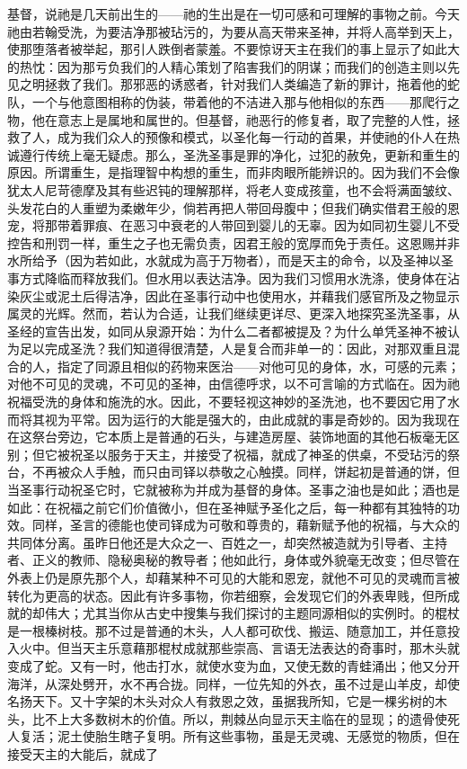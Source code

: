 基督，说祂是几天前出生的——祂的生出是在一切可感和可理解的事物之前。今天祂由若翰受洗，为要洁净那被玷污的，为要从高天带来圣神，并将人高举到天上，使那堕落者被举起，那引人跌倒者蒙羞。不要惊讶天主在我们的事上显示了如此大的热忱：因为那亏负我们的人精心策划了陷害我们的阴谋；而我们的创造主则以先见之明拯救了我们。那邪恶的诱惑者，针对我们人类编造了新的罪计，拖着他的蛇队，一个与他意图相称的伪装，带着他的不洁进入那与他相似的东西——那爬行之物，他在意志上是属地和属世的。但基督，祂恶行的修复者，取了完整的人性，拯救了人，成为我们众人的预像和模式，以圣化每一行动的首果，并使祂的仆人在热诚遵行传统上毫无疑虑。那么，圣洗圣事是罪的净化，过犯的赦免，更新和重生的原因。所谓重生，是指理智中构想的重生，而非肉眼所能辨识的。因为我们不会像犹太人尼苛德摩及其有些迟钝的理解那样，将老人变成孩童，也不会将满面皱纹、头发花白的人重塑为柔嫩年少，倘若再把人带回母腹中；但我们确实借君王般的恩宠，将那带着罪痕、在恶习中衰老的人带回到婴儿的无辜。因为如同初生婴儿不受控告和刑罚一样，重生之子也无需负责，因君王般的宽厚而免于责任。这恩赐并非水所给予（因为若如此，水就成为高于万物者），而是天主的命令，以及圣神以圣事方式降临而释放我们。但水用以表达洁净。因为我们习惯用水洗涤，使身体在沾染灰尘或泥土后得洁净，因此在圣事行动中也使用水，并藉我们感官所及之物显示属灵的光辉。然而，若认为合适，让我们继续更详尽、更深入地探究圣洗圣事，从圣经的宣告出发，如同从泉源开始：为什么二者都被提及？为什么单凭圣神不被认为足以完成圣洗？我们知道得很清楚，人是复合而非单一的：因此，对那双重且混合的人，指定了同源且相似的药物来医治——对他可见的身体，水，可感的元素；对他不可见的灵魂，不可见的圣神，由信德呼求，以不可言喻的方式临在。因为祂祝福受洗的身体和施洗的水。因此，不要轻视这神妙的圣洗池，也不要因它用了水而将其视为平常。因为运行的大能是强大的，由此成就的事是奇妙的。因为我现在在这祭台旁边，它本质上是普通的石头，与建造房屋、装饰地面的其他石板毫无区别；但它被祝圣以服务于天主，并接受了祝福，就成了神圣的供桌，不受玷污的祭台，不再被众人手触，而只由司铎以恭敬之心触摸。同样，饼起初是普通的饼，但当圣事行动祝圣它时，它就被称为并成为基督的身体。圣事之油也是如此；酒也是如此：在祝福之前它们价值微小，但在圣神赋予圣化之后，每一种都有其独特的功效。同样，圣言的德能也使司铎成为可敬和尊贵的，藉新赋予他的祝福，与大众的共同体分离。虽昨日他还是大众之一、百姓之一，却突然被造就为引导者、主持者、正义的教师、隐秘奥秘的教导者；他如此行，身体或外貌毫无改变；但尽管在外表上仍是原先那个人，却藉某种不可见的大能和恩宠，就他不可见的灵魂而言被转化为更高的状态。因此有许多事物，你若细察，会发现它们的外表卑贱，但所成就的却伟大；尤其当你从古史中搜集与我们探讨的主题同源相似的实例时。的棍杖是一根榛树枝。那不过是普通的木头，人人都可砍伐、搬运、随意加工，并任意投入火中。但当天主乐意藉那棍杖成就那些崇高、言语无法表达的奇事时，那木头就变成了蛇。又有一时，他击打水，就使水变为血，又使无数的青蛙涌出；他又分开海洋，从深处劈开，水不再合拢。同样，一位先知的外衣，虽不过是山羊皮，却使名扬天下。又十字架的木头对众人有救恩之效，虽据我所知，它是一棵劣树的木头，比不上大多数树木的价值。所以，荆棘丛向显示天主临在的显现；的遗骨使死人复活；泥土使胎生瞎子复明。所有这些事物，虽是无灵魂、无感觉的物质，但在接受天主的大能后，就成了